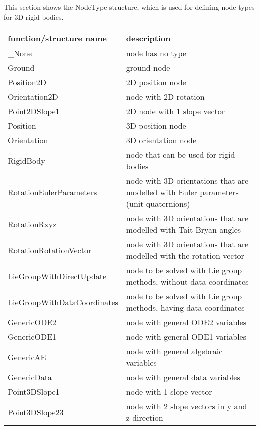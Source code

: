 \label{sec:NodeType}
This section shows the NodeType structure, which is used for defining node types for 3D rigid bodies.



\begin{center}
\footnotesize
\begin{longtable}{| p{8cm} | p{8cm} |} 
\hline
{\bf function/structure name} & {\bf description}\\ \hline
  \_None & node has no type\\ \hline  
  Ground & ground node\\ \hline  
  Position2D & 2D position node \\ \hline  
  Orientation2D & node with 2D rotation\\ \hline  
  Point2DSlope1 & 2D node with 1 slope vector\\ \hline  
  Position & 3D position node\\ \hline  
  Orientation & 3D orientation node\\ \hline  
  RigidBody & node that can be used for rigid bodies\\ \hline  
  RotationEulerParameters & node with 3D orientations that are modelled with Euler parameters (unit quaternions)\\ \hline  
  RotationRxyz & node with 3D orientations that are modelled with Tait-Bryan angles\\ \hline  
  RotationRotationVector & node with 3D orientations that are modelled with the rotation vector\\ \hline  
  LieGroupWithDirectUpdate & node to be solved with Lie group methods, without data coordinates\\ \hline  
  LieGroupWithDataCoordinates & node to be solved with Lie group methods, having data coordinates\\ \hline  
  GenericODE2 & node with general ODE2 variables\\ \hline  
  GenericODE1 & node with general ODE1 variables\\ \hline  
  GenericAE & node with general algebraic variables\\ \hline  
  GenericData & node with general data variables\\ \hline  
  Point3DSlope1 & node with 1 slope vector\\ \hline  
  Point3DSlope23 & node with 2 slope vectors in y and z direction\\ \hline  
\end{longtable}
\end{center}

